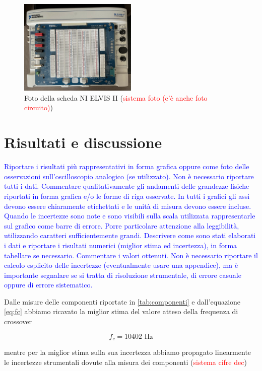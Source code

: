 \documentclass[12pt,italian]{article}
\newcommand{\prof}[1]{\textcolor{blue}{#1}}
\newcommand{\err}[1]{\textcolor{red}{#1}}
\begin{document}
\begin{figure}[h]
	\centering
	\includegraphics[width=0.5\textwidth]{Elvis.jpg}
	\caption{Foto della scheda NI ELVIS II (\err{sistema foto (c'è anche foto circuito)})}
	\label{fig:Elvis}
\end{figure}

\section*{Risultati e discussione}
\prof{ Riportare i risultati più rappresentativi in forma grafica oppure come
	foto delle osservazioni sull'oscilloscopio analogico (se utilizzato). Non è
	necessario riportare tutti i dati. Commentare qualitativamente gli andamenti
	delle grandezze fisiche riportati in forma grafica e/o le forme di riga
	osservate. In tutti i grafici gli assi devono essere chiaramente etichettati e
	le unità di misura devono essere incluse. Quando le incertezze sono note e
	sono visibili sulla scala utilizzata rappresentarle sul grafico come barre di
	errore. Porre particolare attenzione alla leggibilità, utilizzando caratteri
	sufficientemente grandi. Descrivere come sono stati elaborati i dati e
	riportare i risultati numerici (miglior stima ed incertezza), in forma
	tabellare se necessario. Commentare i valori ottenuti. Non è necessario
	riportare il calcolo esplicito delle incertezze (eventualmente usare una
	appendice), ma è importante segnalare se si tratta di risoluzione strumentale,
	di errore casuale oppure di errore sistematico. }

Dalle misure delle componenti riportate in \cref{tab:componenti} e
dall'equazione \eqref{eq:fc} abbiamo ricavato la miglior stima del valore
atteso della frequenza di crossover

\begin{equation*}
	f_{c} = 10402 \text{ Hz}
\end{equation*}

\noindent
mentre per la miglior stima sulla sua incertezza abbiamo propagato linearmente
le incertezze strumentali dovute alla misura dei componenti (\err{sistema cifre dec})
\end{document}
